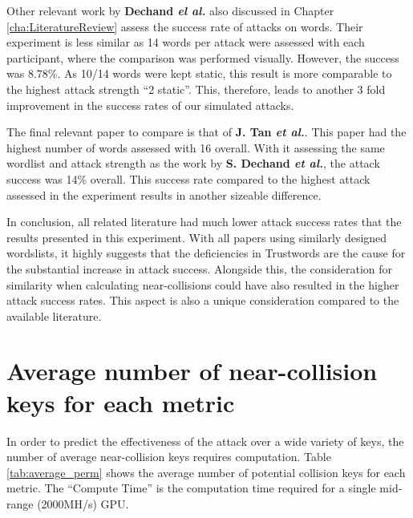 Other relevant work by \textbf{Dechand \textit{el al.}}\cite{dechand2016empirical} also discussed in Chapter \ref{cha:LiteratureReview} assess the success rate of attacks on words. Their experiment is less similar as 14 words per attack were assessed with each participant, where the comparison was performed visually. However, the success was 8.78\%. As 10/14 words were kept static, this result is more comparable to the highest attack strength ``2 static''. This, therefore, leads to another 3 fold improvement in the success rates of our simulated attacks. 

The final relevant paper to compare is that of \textbf{J. Tan \textit{et al.}}\cite{tan2017can}. This paper had the highest number of words assessed with 16 overall. With it assessing the same wordlist and attack strength as the work by \textbf{S. Dechand \textit{et al.}}\cite{dechand2016empirical}, the attack success was 14\% overall. This success rate compared to the highest attack assessed in the experiment results in another sizeable difference.

In conclusion, all related literature had much lower attack success rates that the results presented in this experiment. With all papers using similarly designed wordslists, it highly suggests that the deficiencies in Trustwords are the cause for the substantial increase in attack success. Alongside this, the consideration for similarity when calculating near-collisions could have also resulted in the higher attack success rates. This aspect is also a unique consideration compared to the available literature.


\section{Average number of near-collision keys for each metric}
\label{sec:averagePerms}
In order to predict the effectiveness of the attack over a wide variety of keys, the number of average near-collision keys requires computation. Table \ref{tab:average_perm} shows the average number of potential collision keys for each metric. The ``Compute Time'' is the computation time required for a single mid-range (2000MH/s) GPU.

